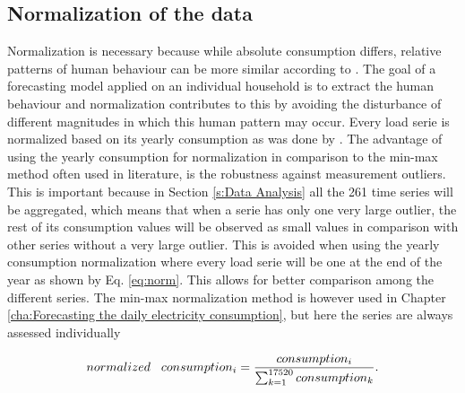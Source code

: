\subsection{Normalization of the data}
\label{s:Normalization of the data}
Normalization is necessary because while absolute consumption differs, relative patterns of human behaviour can be more similar according to \cite{Lago2020}. The goal of a forecasting model applied on an individual household is to extract the human behaviour and normalization contributes to this by avoiding the disturbance of different magnitudes in which this human pattern may occur. Every load serie is normalized based on its yearly consumption as was done by \cite{Lago2020}. The advantage of using the yearly consumption for normalization in comparison to the min-max method often used in literature, is the robustness against measurement outliers. This is important because in Section \ref{s:Data Analysis} all the 261 time series will be aggregated, which means that when a serie has only one very large outlier, the rest of its consumption values will be observed as small values in comparison with other series without a very large outlier. This is avoided when using the yearly consumption normalization where every load serie will be one at the end of the year as shown by Eq. \ref{eq:norm}. This allows for better comparison among the different series. The min-max normalization method is however used in Chapter \ref{cha:Forecasting the daily electricity consumption}, but here the series are always assessed individually

\begin{equation}\label{eq:norm}
	normalized\hspace{0.3cm} consumption_i = \frac{consumption_i}{\sum_{k=1}^{17520} consumption_k}.
\end{equation} 


